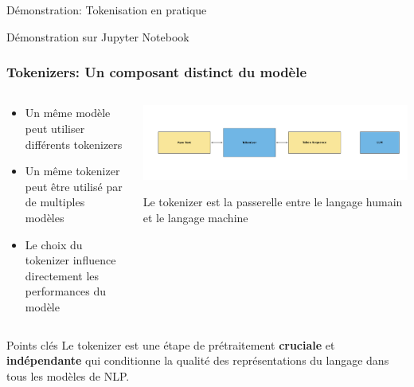 \documentclass[aspectratio=169,11pt]{beamer}
\begin{document}
\begin{frame}{Démonstration: Tokenisation en pratique}
    \begin{center}
        Démonstration sur Jupyter Notebook
    \end{center}
\end{frame}


\begin{frame}
    \frametitle{Tokenizers: Un composant distinct du modèle}
    
    \begin{columns}[T]
        \begin{column}{0.45\textwidth}
            \begin{itemize}
                \item Un même modèle peut utiliser différents tokenizers
                \item Un même tokenizer peut être utilisé par de multiples modèles
                \item Le choix du tokenizer influence directement les performances du modèle
            \end{itemize}
        \end{column}
        
        \begin{column}{0.55\textwidth}
            \includegraphics[width=\textwidth]{images/generated/tokenizer_model_separation.png}
            \vspace{-0.5cm}
            \begin{center}
                \footnotesize{Le tokenizer est la passerelle entre le langage humain et le langage machine}
            \end{center}
        \end{column}
    \end{columns}
    
    \vspace{0.3cm}
    \begin{alertblock}{Points clés}
        Le tokenizer est une étape de prétraitement \textbf{cruciale} et \textbf{indépendante} qui conditionne la qualité des représentations du langage dans tous les modèles de NLP.
    \end{alertblock}
\end{frame}
\end{document}
